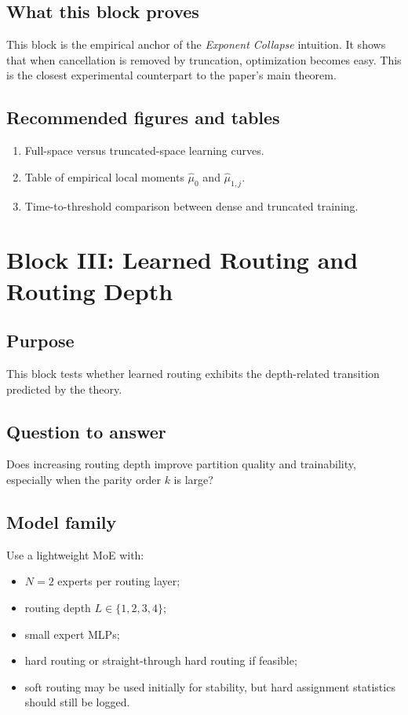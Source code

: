 \documentclass[11pt]{article}
\begin{document}
\subsection{What this block proves}

This block is the empirical anchor of the \emph{Exponent Collapse} intuition. It shows that when cancellation is removed by truncation, optimization becomes easy. This is the closest experimental counterpart to the paper's main theorem.

\subsection{Recommended figures and tables}

\begin{enumerate}[leftmargin=2em]
    \item Full-space versus truncated-space learning curves.
    \item Table of empirical local moments $\hat{\mu}_0$ and $\hat{\mu}_{1,j}$.
    \item Time-to-threshold comparison between dense and truncated training.
\end{enumerate}

\section{Block III: Learned Routing and Routing Depth}

\subsection{Purpose}

This block tests whether learned routing exhibits the depth-related transition predicted by the theory.

\subsection{Question to answer}

Does increasing routing depth improve partition quality and trainability, especially when the parity order $k$ is large?

\subsection{Model family}

Use a lightweight MoE with:
\begin{itemize}[leftmargin=2em]
    \item $N=2$ experts per routing layer;
    \item routing depth $L \in \{1,2,3,4\}$;
    \item small expert MLPs;
    \item hard routing or straight-through hard routing if feasible;
    \item soft routing may be used initially for stability, but hard assignment statistics should still be logged.
\end{itemize}
\end{document}
